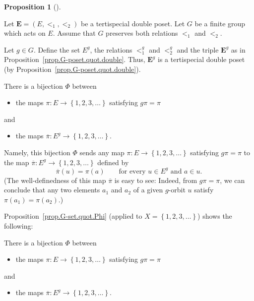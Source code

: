 \documentclass[numbers=enddot,12pt,final,onecolumn,notitlepage,abstracton]{scrartcl}
\theoremstyle{definition}
\newtheorem{prop}[theo]{Proposition}
\newenvironment{proposition}[1][]
{\begin{prop}[#1]\begin{leftbar}}
{\end{leftbar}\end{prop}}
\newenvironment{verlong}{}{}
\newenvironment{vershort}{}{}
\newcommand{\EE}{{\mathbf{E}}}
\begin{document}
\begin{proposition}
\label{prop.G-poset.quot.Phi}
Let $\EE = \left(E, <_1, <_2\right)$ be a tertispecial double poset.
Let $G$ be a finite group which acts on $E$. Assume that $G$ preserves
both relations $<_1$ and $<_2$.

Let $g \in G$. Define the set $E^g$, the relations $<_1^g$ and $<_2^g$
and the triple $\EE^g$ as in Proposition~\ref{prop.G-poset.quot.double}.
Thus, $\EE^g$ is a tertispecial double poset (by
Proposition~\ref{prop.G-poset.quot.double}).

\begin{vershort}
There is a bijection $\Phi$ between

\begin{itemize}
\item the maps $\pi:E\rightarrow\left\{  1,2,3,\ldots\right\}  $ satisfying
$g\pi=\pi$
\end{itemize}

and

\begin{itemize}
\item the maps $\overline{\pi}:E^{g}\rightarrow\left\{  1,2,3,\ldots\right\}
$.
\end{itemize}

Namely, this bijection $\Phi$ sends any map
$\pi:E\rightarrow\left\{  1,2,3,\ldots \right\}  $ satisfying $g\pi=\pi$
to the map $\overline{\pi}:E^{g}
\rightarrow\left\{  1,2,3,\ldots\right\}  $ defined by
\[
\overline{\pi}\left( u \right)
= \pi\left( a \right)
\qquad\text{for every } u \in E^{g} \text{ and } a \in u.
\]
(The well-definedness of this map $\overline{\pi}$ is easy to see:
Indeed, from $g\pi=\pi$, we can conclude that any two elements
$a_1$ and $a_2$ of a given $g$-orbit $u$ satisfy
$\pi\left(a_1\right) = \pi\left(a_2\right)$.)
\end{vershort}

\begin{verlong}
Proposition~\ref{prop.G-set.quot.Phi} (applied to
$X = \left\{1,2,3,\ldots\right\}$) shows the following:

There is a bijection $\Phi$ between

\begin{itemize}
\item the maps $\pi:E\rightarrow\left\{  1,2,3,\ldots\right\}  $ satisfying
$g\pi=\pi$
\end{itemize}

and

\begin{itemize}
\item the maps $\overline{\pi}:E^{g}\rightarrow\left\{  1,2,3,\ldots\right\}
$.
\end{itemize}


\end{verlong}
\end{proposition}
\end{document}
